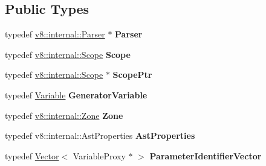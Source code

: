 \subsection*{Public Types}
\begin{DoxyCompactItemize}
\item 
\hypertarget{structv8_1_1internal_1_1_parser_traits_1_1_type_a5178768bb5b327c475a769911e5cd90c}{}typedef \hyperlink{classv8_1_1internal_1_1_parser}{v8\+::internal\+::\+Parser} $\ast$ {\bfseries Parser}\label{structv8_1_1internal_1_1_parser_traits_1_1_type_a5178768bb5b327c475a769911e5cd90c}

\item 
\hypertarget{structv8_1_1internal_1_1_parser_traits_1_1_type_af05cf8a0c4e214f9f88024b0bcfdf311}{}typedef \hyperlink{classv8_1_1internal_1_1_scope}{v8\+::internal\+::\+Scope} {\bfseries Scope}\label{structv8_1_1internal_1_1_parser_traits_1_1_type_af05cf8a0c4e214f9f88024b0bcfdf311}

\item 
\hypertarget{structv8_1_1internal_1_1_parser_traits_1_1_type_a880e42a06d0d471e4c87b2e50fe46f13}{}typedef \hyperlink{classv8_1_1internal_1_1_scope}{v8\+::internal\+::\+Scope} $\ast$ {\bfseries Scope\+Ptr}\label{structv8_1_1internal_1_1_parser_traits_1_1_type_a880e42a06d0d471e4c87b2e50fe46f13}

\item 
\hypertarget{structv8_1_1internal_1_1_parser_traits_1_1_type_aa4ebe05b5eeff7d7c16059be1fb7b96d}{}typedef \hyperlink{classv8_1_1internal_1_1_variable}{Variable} {\bfseries Generator\+Variable}\label{structv8_1_1internal_1_1_parser_traits_1_1_type_aa4ebe05b5eeff7d7c16059be1fb7b96d}

\item 
\hypertarget{structv8_1_1internal_1_1_parser_traits_1_1_type_a0783c00c10437a8d07c4d26a6d943f37}{}typedef \hyperlink{classv8_1_1internal_1_1_zone}{v8\+::internal\+::\+Zone} {\bfseries Zone}\label{structv8_1_1internal_1_1_parser_traits_1_1_type_a0783c00c10437a8d07c4d26a6d943f37}

\item 
\hypertarget{structv8_1_1internal_1_1_parser_traits_1_1_type_ac542bac602167f7f45669e607a5a37b5}{}typedef v8\+::internal\+::\+Ast\+Properties {\bfseries Ast\+Properties}\label{structv8_1_1internal_1_1_parser_traits_1_1_type_ac542bac602167f7f45669e607a5a37b5}

\item 
\hypertarget{structv8_1_1internal_1_1_parser_traits_1_1_type_a6977f2ca6e1ea62f0292afbb2e43b83a}{}typedef \hyperlink{classv8_1_1internal_1_1_vector}{Vector}$<$ Variable\+Proxy $\ast$ $>$ {\bfseries Parameter\+Identifier\+Vector}\label{structv8_1_1internal_1_1_parser_traits_1_1_type_a6977f2ca6e1ea62f0292afbb2e43b83a}


\end{DoxyCompactItemize}
